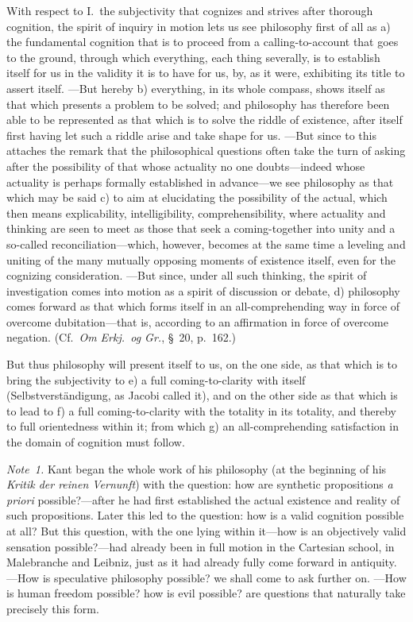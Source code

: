 \documentclass[12pt,a4paper]{book}
\begin{document}
With respect to I.~the subjectivity that cognizes and strives after thorough
cognition, the spirit of inquiry in motion lets us see philosophy first of all as
a) the fundamental cognition that is to proceed from a calling-to-account that goes
to the ground, through which everything, each thing severally, is to establish
itself for us in the validity it is to have for us, by, as it were, exhibiting its
title to assert itself. ---But hereby b) everything, in its whole compass, shows
itself as that which presents a problem to be solved; and philosophy has therefore
been able to be represented as that which is to solve the riddle of existence,
after itself first having let such a riddle arise and take shape for us. ---But
since to this attaches the remark that the philosophical questions often take the
turn of asking after the possibility of that whose actuality no one doubts---indeed
whose actuality is perhaps formally established in advance---we see philosophy as
that which may be said c) to aim at elucidating the possibility of the actual,
which then means explicability, intelligibility, comprehensibility, where actuality
and thinking are seen to meet as those that seek a coming-together into unity and a
so-called reconciliation---which, however, becomes at the same time a leveling and
uniting of the many mutually opposing moments of existence itself, even for the
cognizing consideration. ---But since, under all such thinking, the spirit of
investigation comes into motion as a spirit of discussion or debate, d) philosophy
comes forward as that which forms itself in an all-comprehending way in force of
overcome dubitation---that is, according to an affirmation in force of overcome
negation. (Cf.\ \textit{Om Erkj.\ og Gr.}, \S~20, p.~162.)

But thus philosophy will present itself to us, on the one side, as that which is to
bring the subjectivity to e) a full coming-to-clarity with itself
(Selbstverständigung, as Jacobi called it), and on the other side as that which is
to lead to f) a full coming-to-clarity with the totality in its totality, and
thereby to full orientedness within it; from which g) an all-comprehending
satisfaction in the domain of cognition must follow.

{\small\emph{Note~1.} Kant began the whole work of his philosophy (at the beginning
of his \textit{Kritik der reinen Vernunft}) with the question: how are synthetic
propositions \textit{a priori} possible?---after he had first established the actual
existence and reality of such propositions. Later this led to the question: how is
a valid cognition possible at all? But this question, with the one lying within
it---how is an objectively valid sensation possible?---had already been in full
motion in the Cartesian school, in Malebranche and Leibniz, just as it had already
fully come forward in antiquity. ---How is speculative philosophy possible? we shall
come to ask further on. ---How is human freedom possible? how is evil possible? are
questions that naturally take precisely this form.\par}
\end{document}
